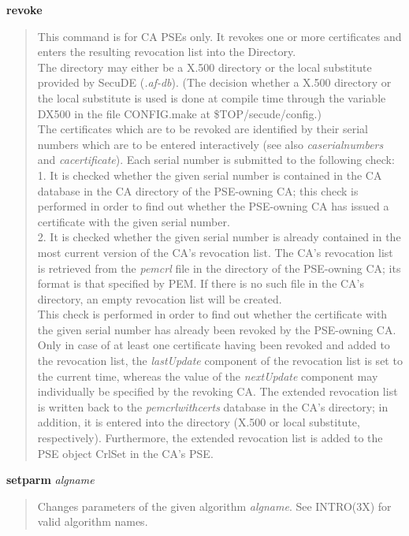 {\bf revoke} 
\begin{quote}
This command is for CA PSEs only.
It revokes one or more certificates and enters the resulting revocation list into the 
Directory. \\
The directory may either be a X.500 directory or the local substitute provided by 
SecuDE ({\em .af-db}). (The decision whether a X.500 directory or the local substitute 
is used is done at compile time through the variable DX500 in the file CONFIG.make
at \$TOP/secude/config.) \\
The certificates which are to be revoked are identified by their serial numbers which are to be
entered interactively (see also {\em caserialnumbers} and {\em cacertificate}). 
Each serial number is submitted to the following check: \\
1. It is checked whether the given serial number is contained in the CA database in the
CA directory of the PSE-owning CA; this check is performed in order to find out whether the 
PSE-owning CA has issued a certificate with the given serial number. \\
2. It is checked whether the given serial number is already contained in the most current version
of the CA's revocation list. The CA's revocation list is retrieved from the {\em pemcrl} file
in the directory of the PSE-owning CA; its format is that specified by PEM. If there is no 
such file in the CA's directory, an empty revocation list will be created. \\
This check is performed in order to find out whether the certificate with the given serial number 
has already been revoked by the PSE-owning CA. \\
Only in case of at least one certificate having been revoked and added to the revocation list, the 
{\em lastUpdate} component of the revocation list is set to the current time, whereas the value 
of the {\em nextUpdate} component may individually be specified by the revoking CA. The extended
revocation list is written back to the {\em pemcrlwithcerts} database in the CA's directory; in addition, 
it is entered into the directory (X.500 or local substitute, respectively). 
Furthermore, the extended revocation list is added to the PSE object CrlSet in the CA's PSE.
\end{quote}

{\bf setparm} {\em algname}
\begin{quote}
Changes parameters of the given algorithm {\em algname}. See INTRO(3X) for valid algorithm names.
\end{quote}

